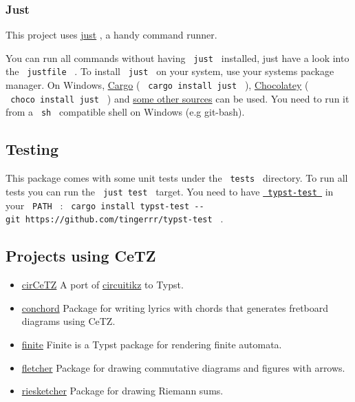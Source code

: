 \subsubsection{Just}\label{just}

This project uses \href{https://github.com/casey/just}{just} , a handy
command runner.

You can run all commands without having \texttt{\ just\ } installed,
just have a look into the \texttt{\ justfile\ } . To install
\texttt{\ just\ } on your system, use your systems package manager. On
Windows, \href{https://doc.rust-lang.org/cargo/}{Cargo} (
\texttt{\ cargo\ install\ just\ } ),
\href{https://chocolatey.org/}{Chocolatey} (
\texttt{\ choco\ install\ just\ } ) and
\href{https://just.systems/man/en/chapter_4.html}{some other sources}
can be used. You need to run it from a \texttt{\ sh\ } compatible shell
on Windows (e.g git-bash).

\subsection{Testing}\label{testing}

This package comes with some unit tests under the \texttt{\ tests\ }
directory. To run all tests you can run the \texttt{\ just\ test\ }
target. You need to have
\href{https://github.com/tingerrr/typst-test/}{\texttt{\ typst-test\ }}
in your \texttt{\ PATH\ } :
\texttt{\ cargo\ install\ typst-test\ -\/-git\ https://github.com/tingerrr/typst-test\ }
.

\subsection{Projects using CeTZ}\label{projects-using-cetz}

\begin{itemize}
\tightlist
\item
  \href{https://github.com/fenjalien/cirCeTZ}{cirCeTZ} A port of
  \href{https://github.com/circuitikz/circuitikz}{circuitikz} to Typst.
\item
  \href{https://github.com/sitandr/conchord}{conchord} Package for
  writing lyrics with chords that generates fretboard diagrams using
  CeTZ.
\item
  \href{https://github.com/jneug/typst-finite}{finite} Finite is a Typst
  package for rendering finite automata.
\item
  \href{https://github.com/Jollywatt/typst-fletcher}{fletcher} Package
  for drawing commutative diagrams and figures with arrows.
\item
  \href{https://github.com/ThatOneCalculator/riesketcher}{riesketcher}
  Package for drawing Riemann sums.
\end{itemize}


